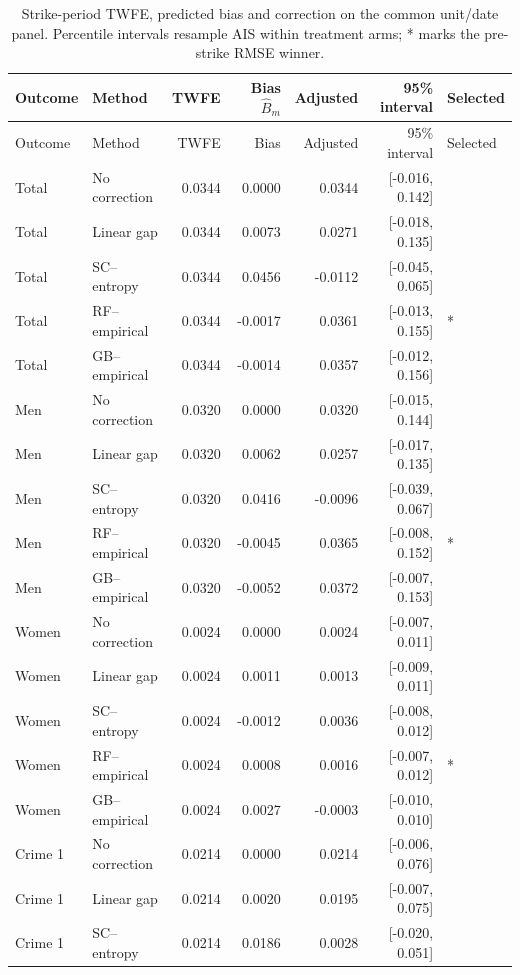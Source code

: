 \begin{longtable}{llrrrrl}
\caption{Strike-period TWFE, predicted bias and correction on the common unit/date panel. Percentile intervals resample AIS within treatment arms; * marks the pre-strike RMSE winner.}\label{tab:estimatesrebuild}\\
\toprule
Outcome & Method & TWFE & Bias $\widehat B_m$ & Adjusted & 95\% interval & Selected\\
\midrule
\endfirsthead
\toprule
Outcome & Method & TWFE & Bias & Adjusted & 95\% interval & Selected\\
\midrule
\endhead
Total & No correction & 0.0344 & 0.0000 & 0.0344 & [-0.016, 0.142] & \\
Total & Linear gap & 0.0344 & 0.0073 & 0.0271 & [-0.018, 0.135] & \\
Total & SC--entropy & 0.0344 & 0.0456 & -0.0112 & [-0.045, 0.065] & \\
Total & RF--empirical & 0.0344 & -0.0017 & 0.0361 & [-0.013, 0.155] & *\\
Total & GB--empirical & 0.0344 & -0.0014 & 0.0357 & [-0.012, 0.156] & \\
\midrule
Men & No correction & 0.0320 & 0.0000 & 0.0320 & [-0.015, 0.144] & \\
Men & Linear gap & 0.0320 & 0.0062 & 0.0257 & [-0.017, 0.135] & \\
Men & SC--entropy & 0.0320 & 0.0416 & -0.0096 & [-0.039, 0.067] & \\
Men & RF--empirical & 0.0320 & -0.0045 & 0.0365 & [-0.008, 0.152] & *\\
Men & GB--empirical & 0.0320 & -0.0052 & 0.0372 & [-0.007, 0.153] & \\
\midrule
Women & No correction & 0.0024 & 0.0000 & 0.0024 & [-0.007, 0.011] & \\
Women & Linear gap & 0.0024 & 0.0011 & 0.0013 & [-0.009, 0.011] & \\
Women & SC--entropy & 0.0024 & -0.0012 & 0.0036 & [-0.008, 0.012] & \\
Women & RF--empirical & 0.0024 & 0.0008 & 0.0016 & [-0.007, 0.012] & *\\
Women & GB--empirical & 0.0024 & 0.0027 & -0.0003 & [-0.010, 0.010] & \\
\midrule
Crime 1 & No correction & 0.0214 & 0.0000 & 0.0214 & [-0.006, 0.076] & \\
Crime 1 & Linear gap & 0.0214 & 0.0020 & 0.0195 & [-0.007, 0.075] & \\
Crime 1 & SC--entropy & 0.0214 & 0.0186 & 0.0028 & [-0.020, 0.051] & \\

\end{longtable}
